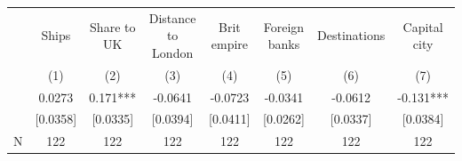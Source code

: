 {
\def\sym#1{\ifmmode^{#1}\else\(^{#1}\)\fi}
\begin{tabular}{l*{7}{c}}
\toprule
            &\multicolumn{1}{c}{Ships}&\multicolumn{1}{c}{Share to UK}&\multicolumn{1}{c}{Distance to London}&\multicolumn{1}{c}{Brit empire}&\multicolumn{1}{c}{Foreign banks}&\multicolumn{1}{c}{Destinations}&\multicolumn{1}{c}{Capital city}\\\cmidrule(lr){2-2}\cmidrule(lr){3-3}\cmidrule(lr){4-4}\cmidrule(lr){5-5}\cmidrule(lr){6-6}\cmidrule(lr){7-7}\cmidrule(lr){8-8}
            &\multicolumn{1}{c}{(1)}   &\multicolumn{1}{c}{(2)}   &\multicolumn{1}{c}{(3)}   &\multicolumn{1}{c}{(4)}   &\multicolumn{1}{c}{(5)}   &\multicolumn{1}{c}{(6)}   &\multicolumn{1}{c}{(7)}   \\
\midrule
{}          &      0.0273   &       0.171***&     -0.0641   &     -0.0723   &     -0.0341   &     -0.0612   &      -0.131***\\
            &    [0.0358]   &    [0.0335]   &    [0.0394]   &    [0.0411]   &    [0.0262]   &    [0.0337]   &    [0.0384]   \\
\midrule
N           &         122   &         122   &         122   &         122   &         122   &         122   &         122   \\
\bottomrule
\end{tabular}
}
